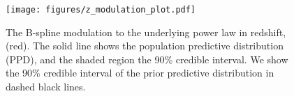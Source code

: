 \begin{figure}[h]
    \texttt{[image: figures/z\_modulation\_plot.pdf]}
    \caption{The B-spline modulation to the underlying power law in redshift, (red). The solid line shows the population predictive distribution (PPD),
    and the shaded region the 90\% credible interval. We show the 90\% credible interval of the prior predictive distribution in dashed black lines.}
    \label{fig:z_modulation}
\end{figure}
